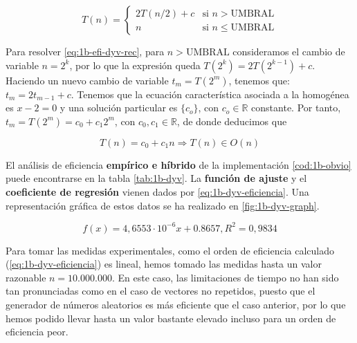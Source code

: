 \begin{equation}
    T(n) = \left\{ \begin{array}{lr} 2 T(n/2) + c & \text{si } n > \text{UMBRAL}\\ n & \text{si } n \leqslant \text{UMBRAL} \end{array} \right.
    \label{eq:1b-efi-dyv-rec}
\end{equation}

Para resolver \ref{eq:1b-efi-dyv-rec}, para $n > \text{UMBRAL}$
consideramos el cambio
de variable $n = 2^k$, por lo que la expresión queda $T(2^k) = 2T(2^{k-1}) + c$. Haciendo
un nuevo cambio de variable $t_m = T(2^m)$, tenemos que:
$t_m = 2 t_{m-1} + c$. Tenemos que la ecuación característica
asociada a la homogénea es $x-2 = 0$ y una solución particular 
es $\{c_o\}$, con $c_o \in \mathbb R$ constante. Por tanto, $t_m = T(2^m) = c_0 + c_1 2^m$,
con $c_0, c_1 \in \mathbb R$, de donde deducimos que 

\begin{equation}
    T(n) = c_0 + c_1 n \Rightarrow \boxed{T(n) \in O(n)}
\end{equation}

El análisis de eficiencia \textbf{empírico e híbrido}
de la implementación \ref{cod:1b-obvio} puede encontrarse en la tabla \ref{tab:1b-dyv}. La 
\textbf{función de ajuste} y el \textbf{coeficiente de regresión} vienen dados 
por \ref{eq:1b-dyv-eficiencia}. Una representación gráfica de estos datos se ha realizado en
\ref{fig:1b-dyv-graph}. 

\begin{equation}
    \boxed{f(x) = 4,6553 \cdot 10^{-6} x + 0.8657, R^2 = 0,9834}
    \label{eq:1b-dyv-eficiencia}
\end{equation}

Para tomar las medidas experimentales, como el orden de eficiencia calculado 
(\ref{eq:1b-dyv-eficiencia}) es lineal, hemos tomado las medidas hasta 
un valor razonable $n=10.000.000$. En este caso, las limitaciones de tiempo
no han sido tan pronunciadas como en el caso de vectores no repetidos,
puesto que el generador de números aleatorios es más eficiente que el caso
anterior, por lo que hemos podido llevar hasta un valor bastante elevado 
incluso para un orden de eficiencia peor. 


